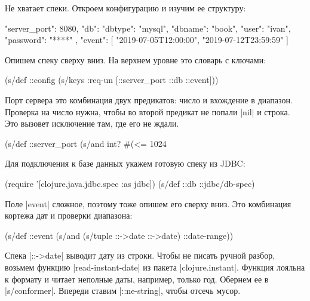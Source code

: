 Не хватает спеки. Откроем конфигурацию и изучим ее структуру:

\begin{english}
  \begin{json}
{
    "server_port": 8080,
    "db": {
        "dbtype":   "mysql",
        "dbname":   "book",
        "user":     "ivan",
        "password": "****"
    },
    "event": [
        "2019-07-05T12:00:00",
        "2019-07-12T23:59:59"
    ]
}
  \end{json}
\end{english}

\noindent
Опишем спеку сверху вниз. На верхнем уровне это словарь с ключами:

\begin{english}
  \begin{clojure}
(s/def ::config
  (s/keys :req-un [::server_port ::db ::event]))
  \end{clojure}
\end{english}

Порт сервера это комбинация двух предикатов: число и вхождение в диапазон.
Проверка на число нужна, чтобы во второй предикат не попали \spverb|nil| и
строка. Это вызовет исключение там, где его не ждали.

\begin{english}
  \begin{clojure}
(s/def ::server_port
  (s/and int? #(<= 1024 %
  \end{clojure}
\end{english}

Для подключения к базе данных укажем готовую спеку из JDBC:

\begin{english}
  \begin{clojure}
(require '[clojure.java.jdbc.spec :as jdbc])
(s/def ::db ::jdbc/db-spec)
  \end{clojure}
\end{english}


Поле \spverb|event| сложное, поэтому тоже опишем его сверху вниз. Это комбинация
кортежа дат и проверки диапазона:

\begin{english}
  \begin{clojure}
(s/def ::event
  (s/and (s/tuple ::->date ::->date)
         ::date-range))
  \end{clojure}
\end{english}

Спека \spverb|::->date| выводит дату из строки. Чтобы не писать ручной разбор,
возьмем функцию \spverb|read-instant-date| из пакета
\spverb|clojure.instant|. Функция лояльна к формату и читает неполные даты,
например, только год. Обернем ее в \spverb|s/conformer|. Впереди ставим
\spverb|::ne-string|, чтобы отсечь мусор.

